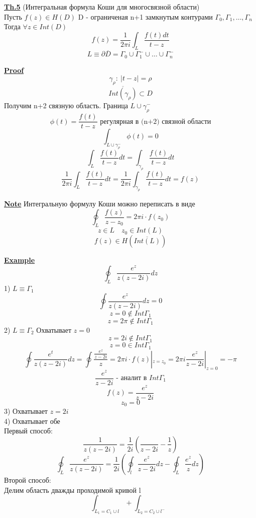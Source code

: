 \documentclass[a4paper]{article}
\begin{document}
\begin{tcolorbox}
\textbf{\underline{Th.5}} (Интегральная формула Коши для многосвязной области)\\
Пусть $ f(z) \in H(D) $ D - ограниченая n+1 замкнутым контурами $ \Gamma_0,
\Gamma_1, \dots, \Gamma_n$ \\
Тогда $ \forall z \in Int(D) $ 
\[
    f(z) = \frac{1}{2\pi i} \int_L \frac{f(t)dt}{t-z} 
\]
\[
    L \equiv \partial \overline{D} = \Gamma_0 \cup \Gamma_1^{-} \cup \dots \cup
    \Gamma_n^{-}
\]

\textbf{\underline{Proof}}
\[
    \gamma_{\rho}: \ |t-z| = \rho
\]
\[
    \overline{Int(\gamma_{\rho})} \subset D
\]
Получим n+2 связную область. Граница $ L \cup \gamma_\rho^{-} $ 
\[
    \phi(t) = \frac{f(t)}{t-z} \text{ регулярная в (n+2) связной области}
\]
\[
    \int_{L \cup \gamma_\rho^{-}} \phi(t) = 0
\]
\[
    \int_L \frac{f(t)}{t-z} dt = \int_{\gamma_\rho} \frac{f(t)}{t-z} dt
\]
\[
    \frac{1}{2\pi i} \int_L \frac{f(t)}{t-z} dt = \frac{1}{2\pi i}
    \int_{\gamma_\rho} \frac{f(t)}{t-z} dt = f(z)
\]
\end{tcolorbox}

\begin{tcolorbox}
\textbf{\underline{Note}} Интегральную формулу Коши можно переписать в виде
\[
    \oint_L \frac{f(z)}{z-z_0} = 2\pi i \cdot f(z_0)
\]
\[
    z \in L \quad z_0 \in Int(L) 
\]
\[
    f(z) \in H(\overline{Int(L)})
\]
\end{tcolorbox}

\textbf{\underline{Example}}
\[
    \oint_L \frac{e^{z}}{z(z-2i)} dz
\]
1) $ L \equiv \Gamma_1 $ 
\[
    \oint\frac{e^{z}}{z(z-2i)} dz = 0
\]
\[
    z = 0 \notin Int \Gamma_1
\]
\[
    z = 2\pi \notin Int \Gamma_1
\]
2) $ L \equiv \Gamma_2  $ Охватывает $ z = 0 $ 
\[
    z = 2i \notin Int \Gamma_1
\]
\[
    z = 0 \in Int \Gamma_1
\]
\[
    \oint \frac{e^{t}}{z(z-2i)} dz = \oint \frac{\frac{e^{z}}{z - 2i} }{z} =
    2\pi i \cdot f(z)|_{z = z_0} = 2\pi i \frac{e^{z}}{z-2i} |_{z=0} = -\pi
\]
\[
    \frac{e^{z}}{z - 2i} \text{ - аналит в } Int \Gamma_1
\]
\[
    f(z) = \frac{e^{z}}{z - 2i} 
\]
\[
    z_0 = 0
\]
3) Охватывает $ z = 2i $\\
4) Охватывает обе\\
Первый способ:
\[
    \frac{1}{z(z-2i)} = \frac{1}{2i} \left(\frac{}{z-2i} - \frac{1}{z} \right)
\]
\[
    \oint_L \frac{e^{z}}{z(z-2i)} = \frac{1}{2i} \left( \oint_l \frac{e^{z}}{z - 2i} 
        dz - \oint_L \frac{e^{z}}{z} dz \right)
\]
Второй способ:\\
Делим область дважды проходимой кривой l
\[
    \int_{L_1=C_1 \cup l} + \int_{L_2 = C_2 \cup l^{-}}
\]
\end{document}
